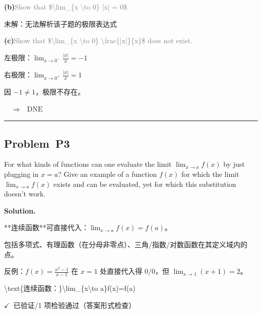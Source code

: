 \documentclass[12pt, a4paper]{article}
\newcommand{\problem}[1]{\subsection*{Problem~#1}}
\newcommand{\solution}{%
  \par\noindent
  {\color{solutiongreen}\bfseries Solution.}\par
}
\newcommand{\verifyok}{\textcolor{solutiongreen}{\ensuremath{\checkmark}\ 已验证}}
\begin{document}
\vspace{0.3em}
\textbf{(b)}\quad \textcolor{gray}{\small Show that \$\textbackslash{}lim\_\{x \textbackslash{}to 0\} |x| = 0\$.}

\textcolor{warnamber}{未解：无法解析该子题的极限表达式}

\textbf{(c)}\quad \textcolor{gray}{\small Show that \$\textbackslash{}lim\_\{x \textbackslash{}to 0\} \textbackslash{}frac\{|x|\}\{x\}\$ does not exist.}

左极限：$\lim_{x \to 0^-} \frac{\left|{x}\right|}{x} = -1$

右极限：$\lim_{x \to 0^+} \frac{\left|{x}\right|}{x} = 1$

因 $-1 \neq 1$，极限不存在。

$\quad\Rightarrow\quad \text{DNE}$


\vspace{0.8em}\hrule\vspace{0.8em}

\problem{P3}

\begin{stepbox}
For what kinds of functions can one evaluate the limit $\lim_{x \to a} f(x)$ by just plugging in $x = a$? Give an example of a function $f(x)$ for which the limit $\lim_{x \to a} f(x)$ exists and can be evaluated, yet for which this substitution doesn't work.
\end{stepbox}

\solution

\begin{stepbox}
**连续函数**可直接代入：$\lim_{x\to a}f(x)=f(a)$。
\end{stepbox}

\begin{stepbox}
包括多项式、有理函数（在分母非零点）、三角/指数/对数函数在其定义域内的点。
\end{stepbox}

\begin{stepbox}
反例：$f(x)=\frac{x^2-1}{x-1}$ 在 $x=1$ 处直接代入得 $0/0$，但 $\lim_{x\to1}(x+1)=2$。
\end{stepbox}

\begin{center}
\textbackslash{}text\{连续函数：\}\textbackslash{}lim\_\{x\textbackslash{}to a\}f(x)=f(a)
\end{center}

\begin{verifybox}\small \verifyok{}/1 项检验通过（答案形式检查） \end{verifybox}
\end{document}
